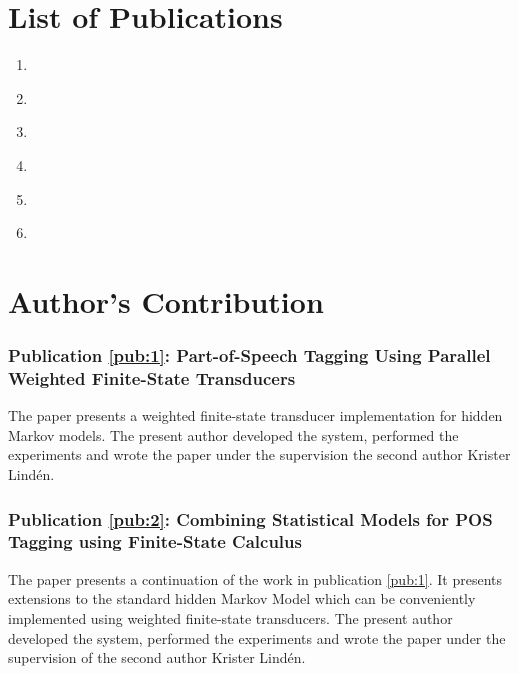 \chapter*{List of Publications}
\nobibliography*
\begin{enumerate}[label=\textbf{\Roman*}]
\item\label{pub:1}\noindent{}\\[1cm]

\item\label{pub:2}\noindent{}\\[1cm]

\item\label{pub:3}\noindent{}\\[1cm]

\item\label{pub:4}\noindent{}\\[1cm]

\item\label{pub:5}\noindent{}\\[1cm]

\item\label{pub:6}\noindent{}
\end{enumerate}
\chapter*{Author's Contribution}
\subsection*{\bf Publication \ref{pub:1}: Part-of-Speech Tagging Using Parallel Weighted Finite-State Transducers}
\noindent The paper presents a weighted finite-state transducer
implementation for hidden Markov models. The present author developed
the system, performed the experiments and wrote the paper under the
supervision the second author Krister Lind\'{e}n.

\subsection*{\bf Publication \ref{pub:2}: Combining Statistical Models for {POS} Tagging using Finite-State Calculus}
\noindent The paper presents a continuation of the work in publication
\ref{pub:1}. It presents extensions to the standard hidden Markov
Model which can be conveniently implemented using weighted
finite-state transducers. The present author developed the system,
performed the experiments and wrote the paper under the supervision of
the second author Krister Lind\'{e}n.

